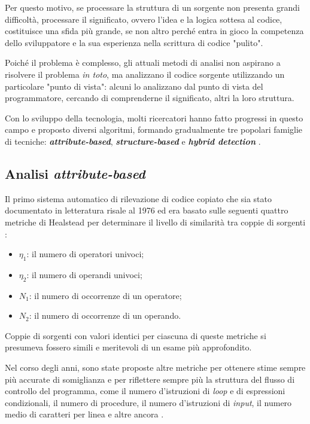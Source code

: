 Per questo motivo, se processare la struttura di un sorgente non presenta grandi difficoltà, processare il significato, ovvero l'idea e la logica sottesa al codice, costituisce una sfida più grande, se non altro perché entra in gioco la competenza dello sviluppatore e la sua esperienza nella scrittura di codice "pulito".

Poiché il problema è complesso, gli attuali metodi di analisi non aspirano a risolvere il problema \textit{in toto}, ma analizzano il codice sorgente utilizzando un particolare "punto di vista": alcuni lo analizzano dal punto di vista del programmatore, cercando di comprenderne il significato, altri la loro struttura.

Con lo sviluppo della tecnologia, molti ricercatori hanno fatto progressi in questo campo e proposto diversi algoritmi, formando gradualmente tre popolari famiglie di tecniche: \textbf{\textit{attribute-based}}, \textbf{\textit{structure-based}} e \textbf{\textit{hybrid detection}} \cite{es-plag}.

\subsection{Analisi \textit{attribute-based}}
Il primo sistema automatico di rilevazione di codice copiato che sia stato documentato in letteratura risale al 1976 \cite{ottenstein} ed era basato sulle seguenti quattro metriche di Healstead per determinare il livello di similarità tra coppie di sorgenti \cite{halstead}:

\begin{itemize}
    \item $\eta_1$: il numero di operatori univoci;
    \item $\eta_2$: il numero di operandi univoci;
    \item $N_1$: il numero di occorrenze di un operatore;
    \item $N_2$: il numero di occorrenze di un operando.
\end{itemize}

Coppie di sorgenti con valori identici per ciascuna di queste metriche si presumeva fossero simili e meritevoli di un esame più approfondito.

Nel corso degli anni, sono state proposte altre metriche per ottenere stime sempre più accurate di somiglianza e per riflettere sempre più la struttura del flusso di controllo del programma, come il numero d'istruzioni di \textit{loop} e di espressioni condizionali, il numero di procedure, il numero d'istruzioni di \textit{input}, il numero medio di caratteri per linea e altre ancora \cite{pdectet}.

